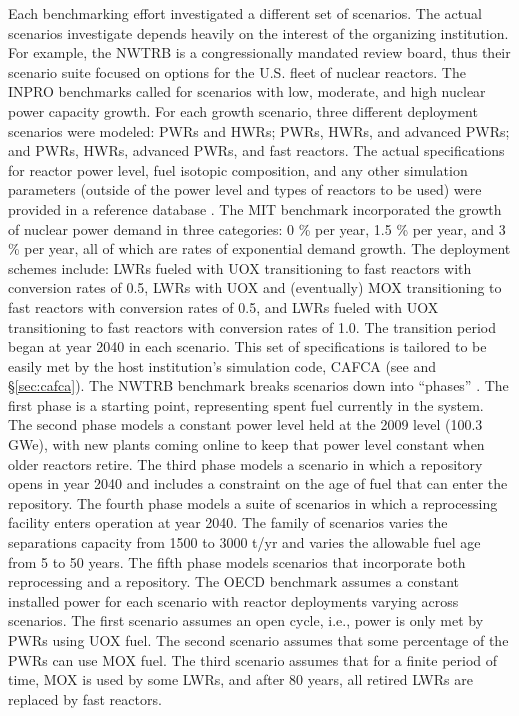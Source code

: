 Each benchmarking effort investigated a different set of scenarios. The actual
scenarios investigate depends heavily on the interest of the organizing
institution. For example, the NWTRB is a congressionally mandated review board,
thus their scenario suite focused on options for the U.S. fleet of nuclear
reactors. The INPRO benchmarks called for scenarios with low, moderate, and high
nuclear power capacity growth. For each growth scenario, three different
deployment scenarios were modeled: PWRs and HWRs; PWRs, HWRs, and advanced PWRs;
and PWRs, HWRs, advanced PWRs, and fast reactors. The actual specifications for
reactor power level, fuel isotopic composition, and any other simulation
parameters (outside of the power level and types of reactors to be used) were
provided in a reference database \cite{_international_2009}. The MIT benchmark
incorporated the growth of nuclear power demand in three categories: 0 \% per
year, 1.5 \% per year, and 3 \% per year, all of which are rates of exponential
demand growth. The deployment schemes include: LWRs fueled with UOX
transitioning to fast reactors with conversion rates of 0.5, LWRs with UOX and
(eventually) MOX transitioning to fast reactors with conversion rates of 0.5,
and LWRs fueled with UOX transitioning to fast reactors with conversion rates of
1.0. The transition period began at year 2040 in each scenario. This set of
specifications is tailored to be easily met by the host institution's simulation
code, CAFCA (see \cite{guerin_benchmark_2009} and \S\ref{sec:cafca}). The NWTRB
benchmark breaks scenarios down into
``phases'' \cite{abkowitz_scenario_2011}. The first phase is a starting point,
representing spent fuel currently in the system. The second phase models a
constant power level held at the 2009 level (100.3 GWe), with new plants coming
online to keep that power level constant when older reactors retire. The third
phase models a scenario in which a repository opens in year 2040 and includes a
constraint on the age of fuel that can enter the repository. The fourth phase
models a suite of scenarios in which a reprocessing facility enters operation at
year 2040. The family of scenarios varies the separations capacity from 1500 to
3000 t/yr and varies the allowable fuel age from 5 to 50 years. The fifth phase
models scenarios that incorporate both reprocessing and a repository. The OECD
benchmark assumes a constant installed power for each scenario with reactor
deployments varying across scenarios. The first scenario assumes an open cycle,
i.e., power is only met by PWRs using UOX fuel. The second scenario assumes that
some percentage of the PWRs can use MOX fuel. The third scenario assumes that
for a finite period of time, MOX is used by some LWRs, and after 80 years, all
retired LWRs are replaced by fast reactors.


